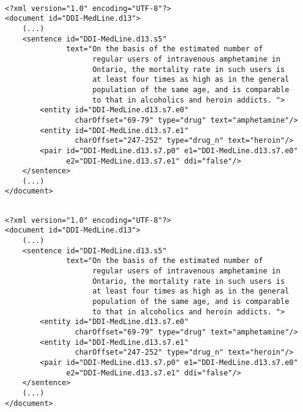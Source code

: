 \documentclass[xcolor={dvipsnames}]{beamer}
\begin{document}
\begin{frame}[fragile]{\insertsection}
\begin{verbatim}

<?xml version="1.0" encoding="UTF-8"?>
<document id="DDI-MedLine.d13">
    (...)
    <sentence id="DDI-MedLine.d13.s5" 
              text="On the basis of the estimated number of
                    regular users of intravenous amphetamine in
                    Ontario, the mortality rate in such users is 
                    at least four times as high as in the general 
                    population of the same age, and is comparable 
                    to that in alcoholics and heroin addicts. ">
        <entity id="DDI-MedLine.d13.s7.e0"
                charOffset="69-79" type="drug" text="amphetamine"/>
        <entity id="DDI-MedLine.d13.s7.e1"
                charOffset="247-252" type="drug_n" text="heroin"/>
        <pair id="DDI-MedLine.d13.s7.p0" e1="DDI-MedLine.d13.s7.e0"
              e2="DDI-MedLine.d13.s7.e1" ddi="false"/>
    </sentence>
    (...)
</document>

\end{verbatim}

\end{frame}

\begin{frame}[fragile]{\insertsection}
\begin{verbatim}

<?xml version="1.0" encoding="UTF-8"?>
<document id="DDI-MedLine.d13">
    (...)
    <sentence id="DDI-MedLine.d13.s5" 
              text="On the basis of the estimated number of
                    regular users of intravenous amphetamine in
                    Ontario, the mortality rate in such users is 
                    at least four times as high as in the general 
                    population of the same age, and is comparable 
                    to that in alcoholics and heroin addicts. ">
        <entity id="DDI-MedLine.d13.s7.e0"
                charOffset="69-79" type="drug" text="amphetamine"/>
        <entity id="DDI-MedLine.d13.s7.e1"
                charOffset="247-252" type="drug_n" text="heroin"/>
        <pair id="DDI-MedLine.d13.s7.p0" e1="DDI-MedLine.d13.s7.e0"
              e2="DDI-MedLine.d13.s7.e1" ddi="false"/>
    </sentence>
    (...)
</document>

\end{verbatim}

\end{frame}
\end{document}

